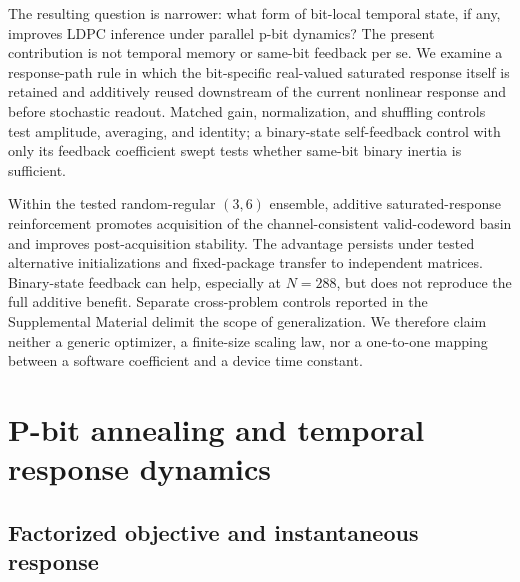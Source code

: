 \documentclass[aps,prapplied,reprint,superscriptaddress,longbibliography,floatfix]{revtex4-2}
\begin{document}
The resulting question is narrower: what form of bit-local temporal state, if any, improves LDPC inference under parallel p-bit dynamics?  The present contribution is not temporal memory or same-bit feedback per se.  We examine a response-path rule in which the bit-specific real-valued saturated response itself is retained and additively reused downstream of the current nonlinear response and before stochastic readout.  Matched gain, normalization, and shuffling controls test amplitude, averaging, and identity; a binary-state self-feedback control with only its feedback coefficient swept tests whether same-bit binary inertia is sufficient.

Within the tested random-regular $(3,6)$ ensemble, additive saturated-response reinforcement promotes acquisition of the channel-consistent valid-codeword basin and improves post-acquisition stability.  The advantage persists under tested alternative initializations and fixed-package transfer to independent matrices.  Binary-state feedback can help, especially at $N=288$, but does not reproduce the full additive benefit.  Separate cross-problem controls reported in the Supplemental Material delimit the scope of generalization.  We therefore claim neither a generic optimizer, a finite-size scaling law, nor a one-to-one mapping between a software coefficient and a device time constant.

\section{P-bit annealing and temporal response dynamics}
\label{sec:dynamics}

\subsection{Factorized objective and instantaneous response}
\end{document}

